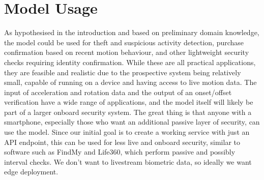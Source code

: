 \section{Model Usage}

As hypothesised in the introduction and based on preliminary domain knowledge, the model could be used for theft and suspicious activity detection, purchase confirmation based on recent motion behaviour, and other lightweight security checks requiring identity confirmation. While these are all practical applications, they are feasible and realistic due to the prospective system being relatively small, capable of running on a device and having access to live motion data. The input of acceleration and rotation data and the output of an onset/offset verification have a wide range of applications, and the model itself will likely be part of a larger onboard security system. The great thing is that anyone with a smartphone, especially those who want an additional passive layer of security, can use the model. Since our initial goal is to create a working service with just an API endpoint, this can be used for less live and onboard security, similar to software such as FindMy and Life360, which perform passive and possibly interval checks. We don't want to livestream biometric data, so ideally we want edge deployment.

